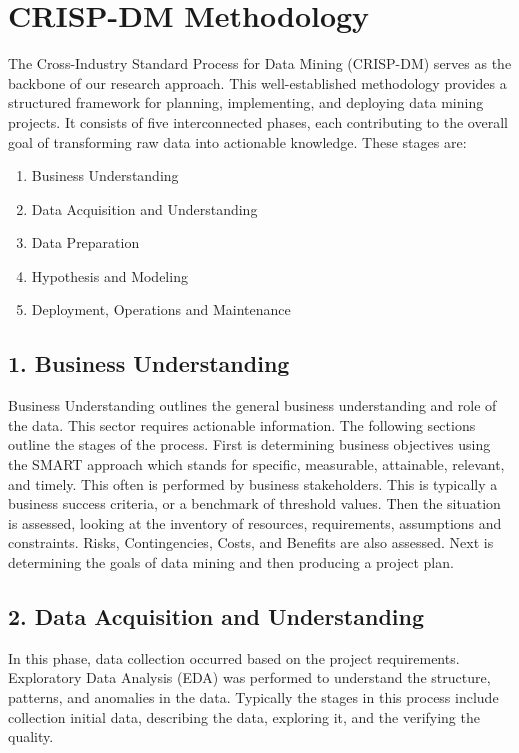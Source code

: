 \documentclass[
	a4paper, %
	10pt, %
	unnumberedsections, %
	twoside, %
]{LTJournalArticle}
\begin{document}
\section{CRISP-DM Methodology}

The Cross-Industry Standard Process for Data Mining (CRISP-DM) serves as the backbone of our research approach. This well-established methodology provides a structured framework for planning, implementing, and deploying data mining projects. It consists of five interconnected phases, each contributing to the overall goal of transforming raw data into actionable knowledge. These stages are:
\begin{enumerate}
	\item Business Understanding
	\item Data Acquisition and Understanding
	\item Data Preparation
        \item Hypothesis and Modeling
        \item Deployment, Operations and Maintenance
\end{enumerate}
\subsection{1. Business Understanding}
Business Understanding outlines the general business understanding and role of the data. This sector requires actionable information. The following sections outline the stages of the process. First is determining business  
objectives using the SMART approach which stands for specific, measurable, attainable, relevant, and timely. This often is performed by business stakeholders. This is typically a business success criteria, or a benchmark of threshold values. Then the situation is assessed, looking at the inventory of resources, requirements, assumptions and constraints. Risks, Contingencies, Costs, and Benefits are also assessed. Next is determining the goals of data mining and then producing a project plan.

\subsection{2. Data Acquisition and Understanding}
In this phase, data collection occurred based on the project requirements. Exploratory Data Analysis (EDA) was performed to understand the structure, patterns, and anomalies in the data. Typically the stages in this process include collection initial data, describing the data, exploring it, and the verifying the quality.
\end{document}
